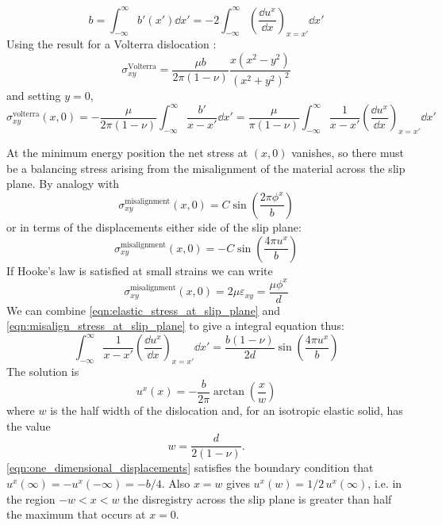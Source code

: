 \begin{equation}
b = \int_{-\infty}^{\infty} b'(x') \dd x' = -2\int^{\infty}_{-\infty} \left( \! \frac{\dd u^x}{\dd x} \right)_{x=x'} \dd x' 
\end{equation}
Using the result for a Volterra dislocation \cite{hirth_lothe_1982_volterra_stress_field}:
\begin{equation}
\sigma^{\text{Volterra}}_{xy} = \frac{\mu b}{2\pi (1-\nu)} \frac{x(x^2 - y^2)}{(x^2+y^2)^2}
\end{equation}
and setting $y=0$,
\begin{equation}
\sigma^{\text{volterra}}_{xy}(x,0) = -\frac{\mu}{2\pi(1-\nu)} \int^{\infty}_{-\infty} \frac{b'}{x-x'} \!\dd x' =  \frac{\mu}{\pi(1-\nu)} \int^{\infty}_{-\infty} \frac{1}{x-x'} \left(\!\frac{\dd u^x}{\dd x}\right)_{x=x'} \!\dd x'
\label{eqn:elastic_stress_at_slip_plane}
\end{equation}

At the minimum energy position the net stress at $(x,0)$ vanishes, so there must be a balancing stress arising from the misalignment of the material across the slip plane. By analogy with \citet{Frenkel1926}
\begin{equation}
\sigma_{xy}^{\text{misalignment}}(x,0) = C \sin \left( \frac{2\pi \phi^x}{b} \right)
\end{equation}
or in terms of the displacements either side of the slip plane:
\begin{equation}
\sigma_{xy}^{\text{misalignment}}(x,0) = -C \sin \left( \frac{4\pi u^x}{b} \right)
\end{equation}
If Hooke's law is satisfied at small strains we can write
\begin{equation}
\sigma_{xy}^{\text{misalignment}}(x,0) = 2 \mu \varepsilon_{xy} = \frac{\mu{}\phi^x}{d}
\label{eqn:misalign_stress_at_slip_plane}
\end{equation}
We can combine \autoref{eqn:elastic_stress_at_slip_plane} and \autoref{eqn:misalign_stress_at_slip_plane} to give a integral equation thus:
\begin{equation}
\int^{\infty}_{-\infty} \frac{1}{x-x'} \left(\!\frac{\dd u^x}{\dd x}\right)_{x=x'} \dd x' = \frac{b(1-\nu)}{2d} \sin\left(\frac{4\pi{}u^x}{b}\right)
\end{equation}
The solution is \cite{hirth_lothe1982peierls_displacements,Eshelby1949}
\begin{equation}
u^x(x) = -\frac{b}{2\pi} \arctan \left( \frac{x}{w} \right)
\label{eqn:one_dimensional_displacements}
\end{equation}
where $w$ is the half width of the dislocation and, for an isotropic elastic solid, has the value
\begin{equation}
w = \frac{d}{2(1-\nu)}.\label{eqn:half_width}
\end{equation}
\autoref{eqn:one_dimensional_displacements} satisfies the boundary condition that $u^x(\infty) = - u^x(-\infty) = -b/4$. Also $x=w$ gives $u^x(w)=1/2\, u^x(\infty)$, i.e. in the region $-w < x < w$ the disregistry across the slip plane is greater than half the maximum that occurs at $x=0$.

